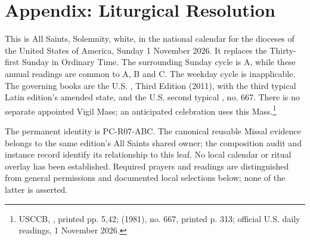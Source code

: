 \newpage
\section{Appendix: Liturgical Resolution}
This is All Saints, Solemnity, white, in the national calendar for the dioceses of the United States of America, Sunday 1 November 2026. It replaces the Thirty-first Sunday in Ordinary Time. The surrounding Sunday cycle is A, while these annual readings are common to A, B and C. The weekday cycle is inapplicable. The governing books are the U.S. , Third Edition (2011), with the third typical Latin edition's amended state, and the U.S. second typical , no. 667. There is no separate appointed Vigil Mass; an anticipated celebration uses this Mass.\footnote{USCCB, , printed pp. 5,42;  (1981), no. 667, printed p. 313; official U.S. daily readings, 1 November 2026.}

The permanent identity is PC-R07-ABC. The canonical reusable Missal evidence belongs to the same edition's All Saints shared owner; the composition audit and instance record identify its relationship to this leaf. No local calendar or ritual overlay has been established. Required prayers and readings are distinguished from general permissions and documented local selections below; none of the latter is asserted.

